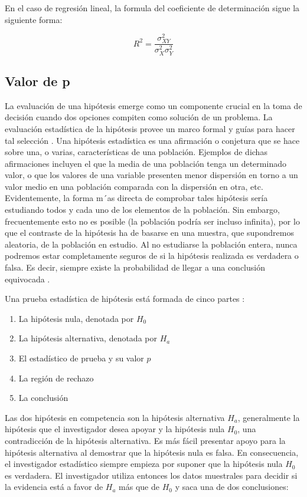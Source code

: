 En el caso de regresión lineal, la formula del coeficiente de determinación sigue la siguiente forma:

\begin{equation}
    R^{2} = \frac{\sigma^{2}_{XY}}{\sigma^{2}_{X}\sigma^{2}_{Y}}
\end{equation}

\subsection{Valor de p}
La evaluación de una hipótesis emerge como un componente crucial en la toma de decisión cuando dos opciones compiten como solución de un problema. La evaluación estadística de la hipótesis provee un marco formal y guías para hacer tal selección \cite{thinkStats}. Una hipótesis estadística es una afirmación o conjetura que se hace sobre una, o varias, características de una población. Ejemplos de dichas afirmaciones incluyen el que la media de una población tenga un determinado valor, o que los valores de una variable presenten menor dispersión en torno a un valor medio en una población comparada con la dispersión en otra, etc. Evidentemente, la forma m´as directa de comprobar tales hipótesis sería estudiando todos y cada uno de los elementos de la población. Sin embargo, frecuentemente esto no es posible (la población podría ser incluso infinita), por lo que el contraste de la hipótesis ha de basarse en una muestra, que supondremos aleatoria, de la población en estudio. Al no estudiarse la población entera, nunca podremos estar completamente seguros de si la hipótesis realizada es verdadera o falsa. Es decir, siempre existe la probabilidad de llegar a una conclusión equivocada \cite{estadisticaBasica}.

Una prueba estadística de hipótesis está formada de cinco partes \cite{mendehall}:

\begin{enumerate}
    \item La hipótesis nula, denotada por $H_0$
    \item La hipótesis alternativa, denotada por $H_a$
    \item El estadístico de prueba y su valor $p$
    \item La región de rechazo
    \item La conclusión
\end{enumerate}

Las dos hipótesis en competencia son la hipótesis alternativa $H_a$, generalmente la hipótesis que el investigador desea apoyar y la hipótesis nula $H_0$, una contradicción de la hipótesis alternativa. Es más fácil presentar apoyo para la hipótesis alternativa al demostrar que la hipótesis nula es falsa. En consecuencia, el investigador estadístico siempre empieza por suponer que la hipótesis nula $H_0$ es verdadera. El investigador utiliza entonces los datos muestrales para decidir si la evidencia está a favor de $H_a$ más que de $H_0$ y saca una de dos conclusiones:

